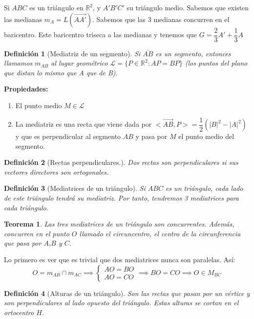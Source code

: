 \documentclass[11pt, a4paper, titlepage]{article}
\makeatletter
\renewenvironment{proof}[1][\proofname] {\vspace{-15pt}\par\pushQED{\qed}\normalfont\topsep6\p@\@plus6\p@\relax\trivlist\item[\hskip\labelsep\it#1\@addpunct{.}]\ignorespaces}{\popQED\endtrivlist\@endpefalse}
\newcommand{\R}{\mathbb{R}}
\theoremstyle{theorem-style}
\newtheorem*{nth}{Teorema}
\theoremstyle{definition-style}
\newtheorem*{ndef}{Definición}
\theoremstyle{remark-style}
\theoremstyle{example-style}
\newenvironment{nlist}
{\begin{enumerate}
\renewcommand\labelenumi{(\emph{\roman{enumi})}}}
{\end{enumerate}}
\makeatother
\begin{document}
Si $ABC$ es un triángulo en $\R^2$, y $A'B'C'$ su triángulo medio. Sabemos que existen las medianas $m_A = L(\vec{AA'})$. Sabemos que las 3 medianas concurren en el baricentro. Este baricentro triseca a las medianas y tenemos que $G = \dfrac{2}{3}A' + \dfrac{1}{3}A$

\begin{ndef}[Mediatriz de un segmento]
	Si $\bar{AB}$ es un segmento, entonces llamamos $m_{AB}$  al lugar geométrico $\mathcal{L}=\{P \in \R^2 : AP = BP\}$ (los puntos del plano que distan lo mismo que A que de B).
\end{ndef}

\textbf{Propiedades:}
\begin{nlist}
	\item El punto medio $M \in \mathcal{L}$
	\item La mediatriz es una recta que viene dada por $<\vec{AB},P> = \dfrac{1}{2}(|B|^2-|A|^2)$ y que es perpendicular al segmento $AB$ y pasa por $M$ el punto medio del segmento.
\end{nlist}

\begin{ndef}[Rectas perpendiculares.]
	Dos rectas son perpendiculares si sus vectores directores son ortogonales.
\end{ndef}

\begin{ndef}[Mediatrices de un triángulo]
	Si $ABC$ es un triángulo, cada lado de este triángulo tendrá su mediatriz. Por tanto, tendremos 3 mediatrices para cada triángulo.
\end{ndef}

\begin{nth}
	Las tres mediatrices de un triángulo son concurrentes. Además, concurren en el punto $O$ llamado el circuncentro, el centro de la circunferencia que pasa por $A$,$B$ y $C$.
\end{nth}
\begin{proof}
	Lo primero es ver que es trivial que dos mediatrices nunca son paralelas. Así:
	\[
	O = m_{AB} \cap m_{AC}\implies \begin{cases}
	AO = BO\\
	AO = CO
\end{cases} \implies BO = CO \implies O \in M_{BC}
	\]
\end{proof}


\begin{ndef}[Alturas de un triángulo]
	Son las rectas que pasan por un vértice y son perpendiculares al lado opuesto del triángulo. Estas alturas se cortan en el ortocentro $H$.
\end{ndef}
\end{document}
